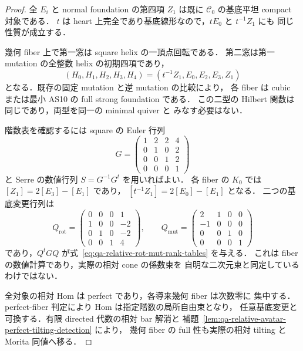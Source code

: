 \begin{proof}
全 $E_i$ と normal foundation の第四項 $Z_1$ は既に
$\mathcal C_0$ の基底平坦 compact 対象である．
$t$ は heart 上完全であり基底線形なので，$tE_0$ と $t^{-1}Z_1$ にも
同じ性質が成立する．

幾何 fiber 上で第一窓は square helix の一頂点回転である．
第二窓は第一 mutation の全整数 helix の初期四項であり，
\[
 (H_0,H_1,H_2,H_3,H_4)
   =(t^{-1}Z_1,E_0,E_2,E_3,Z_1)
\]
となる．既存の固定 mutation と逆 mutation の比較により，
各 fiber は cubic または最小 AS10 の full strong foundation である．
この二型の Hilbert 関数は同じであり，両型を同一の minimal quiver と
みなす必要はない．

階数表を確認するには square の Euler 行列
\[
 G=\begin{pmatrix}1&2&2&4\\0&1&0&2\\0&0&1&2\\0&0&0&1\end{pmatrix}
\]
と Serre の数値行列 $S=G^{-1}G^t$ を用いればよい．
各 fiber の $K_0$ では
$[Z_1]=2[E_3]-[E_1]$ であり，
$[t^{-1}Z_1]=2[E_0]-[E_1]$ となる．
二つの基底変更行列は
\[
 Q_{\mathrm{rot}}=
 \begin{pmatrix}0&0&0&1\\1&0&0&-2\\0&1&0&-2\\0&0&1&4\end{pmatrix},
 \qquad
 Q_{\mathrm{mut}}=
 \begin{pmatrix}2&1&0&0\\-1&0&0&0\\0&0&1&0\\0&0&0&1\end{pmatrix}
\]
であり，$Q^tGQ$ が式~\eqref{eq:qa-relative-rot-mut-rank-tables} を与える．
これは fiber の数値計算であり，実際の相対 cone の係数束を
自明な二次元束と同定しているわけではない．

全対象の相対 Hom は perfect であり，各導来幾何 fiber は次数零に
集中する．perfect-fiber 判定により Hom は指定階数の局所自由束となり，
任意基底変更と可換する．有限 directed 代数の相対 bar 解消と
補題~\ref{lem:qa-relative-avatar-perfect-tilting-detection} により，
幾何 fiber の full 性も実際の相対 tilting と Morita 同値へ移る．
\end{proof}

